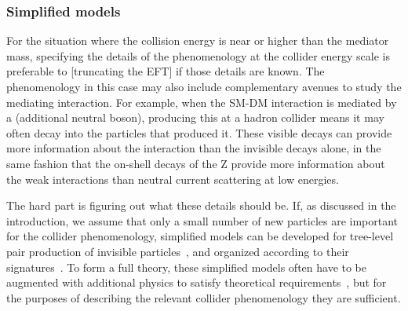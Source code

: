 
\subsubsection{Simplified models}
\label{sub:simplifiedModels}

For the situation where the collision energy is near or higher than the mediator mass, 
specifying the details
of the phenomenology at the collider energy scale is preferable to [truncating the EFT] if those details are known. 
The phenomenology in this case may also include complementary avenues to study the mediating interaction.
For example, when the SM-DM interaction is mediated by a \Zprime (additional neutral boson), producing 
this \Zprime at a hadron collider means it may often decay into the particles that produced it. 
These visible decays can provide more information about the interaction than the invisible decays alone, 
in the same fashion that the on-shell decays of the Z provide more information about the weak interactions than 
neutral current scattering at low energies.

The hard part is figuring out what these details should be. If, as discussed in the introduction,
we assume that only a small number of new particles are important for the collider phenomenology, simplified models can be developed for tree-level pair
production of invisible particles~\cite{Alwall:2008ag, Agrawal:2010fh, Alves:2011wf, Choudhury:2015lha}, and %
organized according to their signatures~\cite{Abercrombie:2015wmb}. 
To form a full theory, these simplified models often have to be augmented with additional physics to satisfy theoretical requirements~\cite{Kahlhoefer:2015bea},
but for the purposes of describing the relevant collider phenomenology they are sufficient. 


